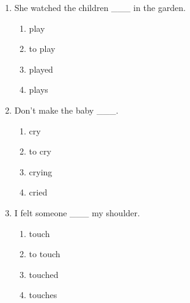 \documentclass[11pt,a4paper]{ctexart}
\begin{document}
\begin{enumerate}[leftmargin=*,itemsep=4pt]
\begin{enumerate}[label=\Alph*.,leftmargin=2em,itemsep=1pt,topsep=2pt]
\item taking
\item took
\end{enumerate}
\item She watched the children \_\_\_ in the garden.
\begin{enumerate}[label=\Alph*.,leftmargin=2em,itemsep=1pt,topsep=2pt]
\item play
\item to play
\item played
\item plays
\end{enumerate}
\item Don’t make the baby \_\_\_.
\begin{enumerate}[label=\Alph*.,leftmargin=2em,itemsep=1pt,topsep=2pt]
\item cry
\item to cry
\item crying
\item cried
\end{enumerate}
\item I felt someone \_\_\_ my shoulder.
\begin{enumerate}[label=\Alph*.,leftmargin=2em,itemsep=1pt,topsep=2pt]
\item touch
\item to touch
\item touched
\item touches
\end{enumerate}
\end{enumerate}

\newpage
\end{document}

